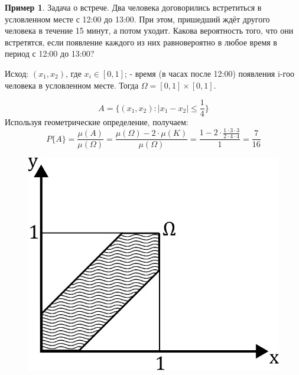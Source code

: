 \documentclass[a4paper, 14pt]{report}
\theoremstyle{definition}
\newtheorem*{example}{Пример}
\begin{document}
			\begin{example}
				Задача о встрече. Два человека договорились встретиться в условленном месте с 12:00 до 13:00. При этом, пришедший ждёт другого человека в течение 15 минут, а потом уходит. Какова вероятность того, что они встретятся, если появление каждого из них равновероятно в любое время в период с 12:00 до 13:00?
			
				Исход: $(x_1,x_2)$, где $x_i\in[0, 1]$; - время (в часах после 12:00) появления i-гоо человека в условленном месте. Тогда $\Omega=[0,1]\times[0,1]$.
				
				\begin{equation}
					A=\{(x_1, x_2): |x_1-x_2|\le \frac{1}{4}\}
				\end{equation}
				Используя геометрические определение, получаем:
				\begin{equation}
					P\{A\}
					=\frac{\mu(A)}{\mu(\Omega)}
					=\frac{\mu(\Omega)-2\cdot\mu(K)}{\mu(\Omega)}
					=\frac{1-2\cdot\frac{1\cdot3\cdot3}{2\cdot4\cdot4}}{1}
					=\frac{7}{16}
				\end{equation}
			
				\begin{figure}[!ht]
					\centering
					\includegraphics{2_jentleman_riddle}
					\caption{}
					\label{fig:2_jentleman_riddle}
				\end{figure}
			\end{example}
		
		
\end{document}
